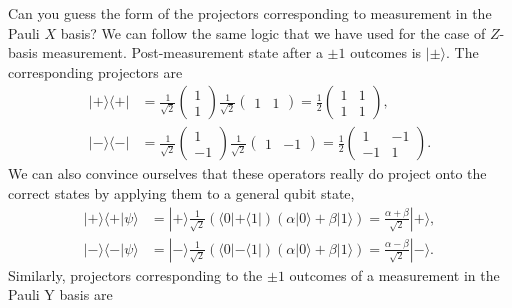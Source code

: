 Can you guess the form of the projectors corresponding to measurement in the Pauli $X$ basis?
We can follow the same logic that we have used for the case of $Z$-basis measurement.
Post-measurement state after a $\pm1$ outcomes is $|\pm\rangle$.
The corresponding projectors are
\begin{align}
    |+\rangle\langle+| & = \frac{1}{\sqrt{2}} \begin{pmatrix} 1 \\ 1 \end{pmatrix} \frac{1}{\sqrt{2}} \begin{pmatrix} 1 & 1 \end{pmatrix} = \frac{1}{2} \begin{pmatrix} 1 & 1 \\ 1 & 1 \end{pmatrix}, \\
    |-\rangle\langle-| & = \frac{1}{\sqrt{2}} \begin{pmatrix} 1 \\ -1 \end{pmatrix} \frac{1}{\sqrt{2}} \begin{pmatrix} 1 & -1 \end{pmatrix} = \frac{1}{2} \begin{pmatrix} 1 & -1 \\ -1 & 1 \end{pmatrix}.
\end{align}
We can also convince ourselves that these operators really do project onto the correct states by applying them to a general qubit state,
\begin{align}
    |+\rangle\langle+|\psi\rangle & = |+\rangle \frac{1}{\sqrt{2}} \left( \langle0| + \langle1| \right) \left( \alpha |0\rangle + \beta|1\rangle \right) = \frac{\alpha+\beta}{\sqrt{2}} |+\rangle, \\
    |-\rangle\langle-|\psi\rangle & = |-\rangle \frac{1}{\sqrt{2}} \left( \langle0| - \langle1| \right) \left( \alpha |0\rangle + \beta|1\rangle \right) = \frac{\alpha-\beta}{\sqrt{2}} |-\rangle.
\end{align}
Similarly, projectors corresponding to the $\pm1$ outcomes of a measurement in the Pauli Y basis are
